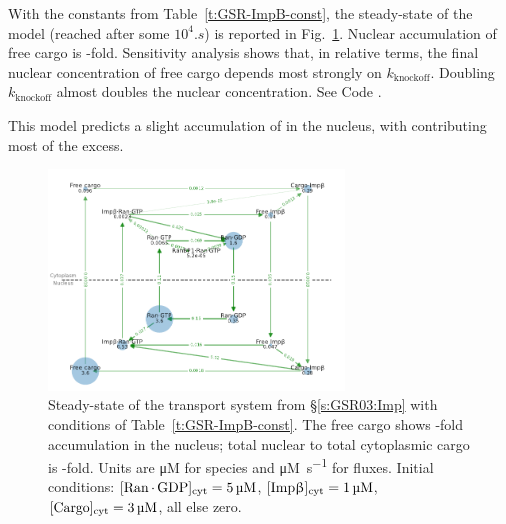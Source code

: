 \documentclass[12pt,notitlepage]{article}
\begin{document}
%

With the constants from Table~\ref{t:GSR-ImpB-const},
the steady-state of the model
(reached after some $10^4 \si{. s}$)
is reported in Fig.~\ref{f:GSR-v2}.
%
Nuclear
accumulation of free cargo
is
\protect\unskip
-fold.
%
%
Sensitivity analysis shows
that, in relative terms,
the final nuclear concentration of free cargo
depends 
most strongly
on
$k_\text{knockoff}$.
%
Doubling $k_\text{knockoff}$ almost doubles 
the nuclear concentration.
%
%
%
See Code .

%

This model predicts a slight accumulation
of  in the nucleus,
with  contributing most of the excess.
%
%


\begin{figure}
\centering
\includegraphics[width=0.7\textwidth]{20210225-GSR/v2/python/graph/onion}
\caption{%
	Steady-state of 
	the transport system from 
	\S\ref{s:GSR03:Imp}
	with conditions 
	of Table~\ref{t:GSR-ImpB-const}.
	The free cargo
	shows 
	\protect\unskip%
	-fold accumulation
	in the nucleus;
	total nuclear to total cytoplasmic cargo
	is
	\protect\unskip%
	-fold.
	Units are \si{\micro M} for species
	and \si{\micro M . s^{-1}} for fluxes.
	Initial conditions:
	$[\ce{Ran . GDP}]_\text{cyt} = \SI{5}{\micro M}$,
	$[\ce{Imp\beta}]_\text{cyt} = \SI{1}{\micro M}$,
	$[\ce{Cargo}]_\text{cyt} = \SI{3}{\micro M}$,
	all else zero.
}
\label{f:GSR-v2}
\end{figure}
\end{document}
